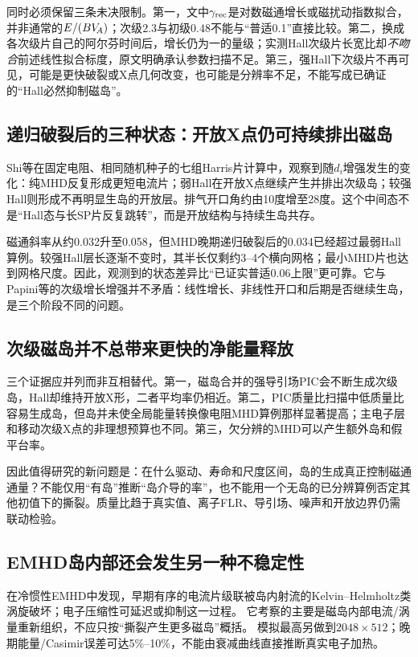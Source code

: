 同时必须保留三条未决限制。第一，文中$\gamma_{\rm rec}$是对数磁通增长或磁扰动指数拟合，并非通常的$E/(BV_{\!A})$；次级$2.3$与初级$0.48$不能与“普适0.1”直接比较。第二，换成各次级片自己的阿尔芬时间后，增长仍为一的量级；实测Hall次级片长宽比却\emph{不吻合}前述线性拟合标度，原文明确承认参数扫描不足。第三，强Hall下次级片不再可见，可能是更快破裂或X点几何改变，也可能是分辨率不足，不能写成已确证的“Hall必然抑制磁岛”。

\subsection{递归破裂后的三种状态：开放X点仍可持续排出磁岛}
Shi等在固定电阻、相同随机种子的七组Harris片计算中，观察到随$d_i$增强发生的变化：纯MHD反复形成更短电流片；弱Hall在开放X点继续产生并排出次级岛；较强Hall则形成不再明显生岛的开放层。排气开口角约由10度增至28度。这个中间态不是“Hall态与长SP片反复跳转”，而是开放结构与持续生岛共存。\citep{L263}

磁通斜率从约0.032升至0.058，但MHD晚期递归破裂后的0.034已经超过最弱Hall算例。较强Hall层长逐渐不变时，其半长仅剩约3--4个横向网格；最小MHD片也达到网格尺度。因此，观测到的状态差异比“已证实普适0.06上限”更可靠。它与Papini等的次级增长增强并不矛盾：线性增长、非线性开口和后期是否继续生岛，是三个阶段不同的问题。\citep{L262,L263}

\subsection{次级磁岛并不总带来更快的净能量释放}
三个证据应并列而非互相替代。第一，磁岛合并的强导引场PIC会不断生成次级岛，Hall却维持开放X形，二者平均率仍相近\citep{L241}。第二，PIC质量比扫描中低质量比容易生成岛，但岛并未使全局能量转换像电阻MHD算例那样显著提高；主电子层和移动次级X点的非理想预算也不同\citep{F606}。第三，欠分辨的MHD可以产生额外岛和假平台率\citep{F788}。

因此值得研究的新问题是：在什么驱动、寿命和尺度区间，岛的生成真正控制磁通通量？不能仅用“有岛”推断“岛介导的率”，也不能用一个无岛的已分辨算例否定其他初值下的撕裂。质量比趋于真实值、离子FLR、导引场、噪声和开放边界仍需联动检验。

\subsection{EMHD岛内部还会发生另一种不稳定性}
\citet{E459}在冷惯性EMHD中发现，早期有序的电流片级联被岛内射流的Kelvin--Helmholtz类涡旋破坏；电子压缩性可延迟或抑制这一过程。
它考察的主要是磁岛内部电流/涡量重新组织，不应只按“撕裂产生更多磁岛”概括。
模拟最高另做到$2048\times512$；晚期能量/Casimir误差可达5\%--10\%，不能由衰减曲线直接推断真实电子加热。

